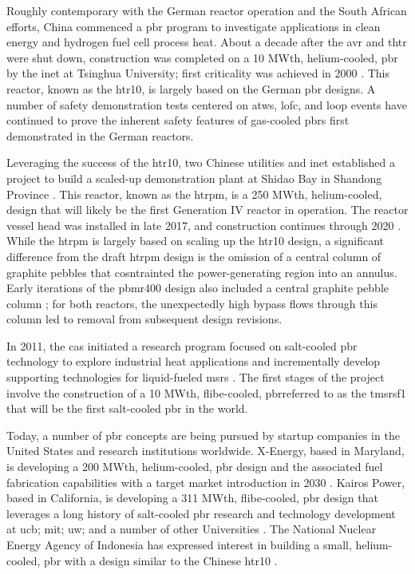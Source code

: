 Roughly contemporary with the German reactor operation and the South African efforts, China commenced a \gls{pbr} program to investigate applications in clean energy and hydrogen fuel cell process heat. About a decade after the \gls{avr} and \gls{thtr} were shut down, construction was completed on a 10 MWth, helium-cooled, \gls{pbr} by the \gls{inet} at Tsinghua University; first criticality was achieved in 2000 \cite{gao,chen_htr,xu_htr}. This reactor, known as the \gls{htr10}, is largely based on the German \gls{pbr} designs. A number of safety demonstration tests centered on \gls{atws}, \gls{lofc}, and \gls{loop} events have continued to prove the inherent safety features of gas-cooled \glspl{pbr} first demonstrated in the German reactors.

Leveraging the success of the \gls{htr10}, two Chinese utilities and \gls{inet} established a project to build a scaled-up demonstration plant at Shidao Bay in Shandong Province \cite{xu_htr,htrpm,htrpm_website}. This reactor, known as the \gls{htrpm}, is a 250 MWth, helium-cooled, design that will likely be the first Generation IV reactor in operation. The reactor vessel head was installed in late 2017, and construction continues through 2020 \cite{htrpm_2020}. While the \gls{htrpm} is largely based on scaling up the \gls{htr10} design, a significant difference from the draft \gls{htrpm} design is the omission of a central column of graphite pebbles that cosntrainted the power-generating region into an annulus. Early iterations of the \gls{pbmr400} design also included a central graphite pebble column \cite{koster}; for both reactors, the unexpectedly high bypass flows through this column led to removal from subsequent design revisions.

In 2011, the \gls{cas} initiated a research program focused on salt-cooled \gls{pbr} technology to explore industrial heat applications and incrementally develop supporting technologies for liquid-fueled \glspl{msr} \cite{dai}. The first stages of the project involve the construction of a 10 MWth, \gls{flibe}-cooled, \gls{pbr}referred to as the \gls{tmsrsf1} that will be the first salt-cooled \gls{pbr} in the world. 

Today, a number of \gls{pbr} concepts are being pursued by startup companies in the United States and research institutions worldwide. X-Energy, based in Maryland, is developing a 200 MWth, helium-cooled, \gls{pbr} design and the associated fuel fabrication capabilities with a target market introduction in 2030 \cite{x_energy}. Kairos Power, based in California, is developing a 311 MWth, \gls{flibe}-cooled, \gls{pbr} design that leverages a long history of salt-cooled \gls{pbr} research and technology development at \gls{ucb}; \gls{mit}; \gls{uw};
 and a number of other Universities \cite{kairos}. The National Nuclear Energy Agency of Indonesia has expressed interest in building a small, helium-cooled, \gls{pbr} with a design similar to the Chinese \gls{htr10} \cite{liem}. 

